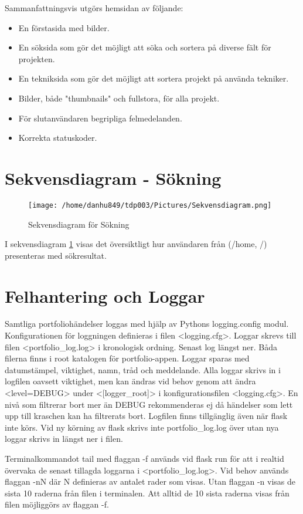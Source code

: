 \documentclass{TDP003mall}
\begin{document}
Sammanfattningsvis utgörs hemsidan av följande:
\begin{itemize}
    \item En förstasida med bilder.
    \item En söksida som gör det möjligt att söka och sortera på diverse fält för projekten.
    \item En tekniksida som gör det möjligt att sortera projekt på använda tekniker.
    \item Bilder, både "thumbnails" och fullstora, för alla projekt.
    \item För slutanvändaren begripliga felmedelanden.
    \item Korrekta statuskoder.
\end{itemize}

\newpage
\section{Sekvensdiagram - Sökning}

\begin{figure}[h]
  \centerline{\texttt{[image: /home/danhu849/tdp003/Pictures/Sekvensdiagram.png]}}
  \caption{Sekvensdiagram för Sökning \label{fig:2}}
\end{figure}

I sekvensdiagram \ref{fig:2} visas det översiktligt hur användaren från (/home, /) presenteras med sökresultat.

\section{Felhantering och Loggar}
Samtliga portfoliohändelser loggas med hjälp av Pythons logging.config modul. Konfigurationen för loggningen definieras i filen <logging.cfg>. Loggar skrevs till filen <portfolio\_log.log> i kronologisk ordning. Senast log längst ner. Båda filerna finns i root katalogen för portfolio-appen. Loggar sparas med datumstämpel, viktighet, namn, tråd och meddelande. Alla loggar skrivs in i logfilen oavsett viktighet, men kan ändras vid behov genom att ändra <level=DEBUG> under <[logger\_root]> i konfigurationsfilen <logging.cfg>. En nivå som filtrerar bort mer än DEBUG rekommenderas ej då händelser som lett upp till kraschen kan ha filtrerats bort. Logfilen finns tillgänglig även när flask inte körs. Vid ny körning av flask skrivs inte portfolio\_log.log över utan nya loggar skrivs in längst ner i filen.

Terminalkommandot tail med flaggan -f används vid flask run för att i realtid övervaka de senast tillagda loggarna i <portfolio\_log.log>. Vid behov används flaggan -nN där N definieras av antalet rader som visas. Utan flaggan -n visas de sista 10 raderna från filen i terminalen. Att alltid de 10 sista raderna visas från filen möjliggörs av flaggan -f.
\end{document}
